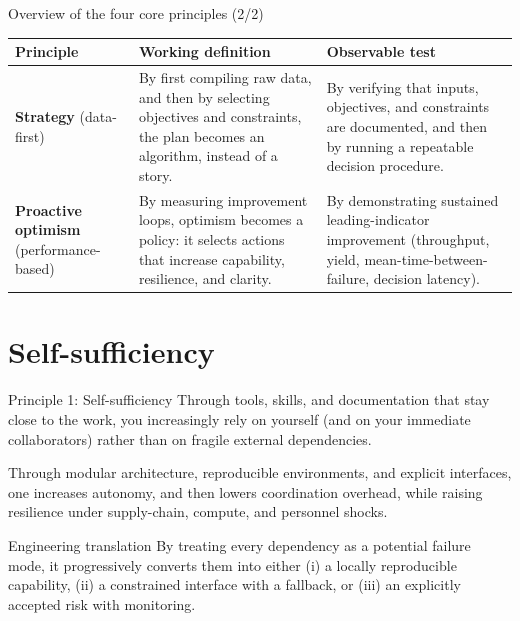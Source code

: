 \documentclass[presentation,aspectratio=169,11pt]{beamer}
\newcommand{\KeyTerm}[1]{\textbf{#1}}
\begin{document}
\begin{frame}{Overview of the four core principles (2/2)}
\justifying
\begin{table}
\scriptsize
\begin{tabularx}{\linewidth}{@{}l X X@{}}
\toprule
\textbf{Principle} & \textbf{Working definition} & \textbf{Observable test}\\
\midrule
\KeyTerm{Strategy} (data-first) & By first compiling raw data, and then by selecting objectives and constraints, the plan becomes an algorithm, instead of a story. & By verifying that inputs, objectives, and constraints are documented, and then by running a repeatable decision procedure.\\
\addlinespace
\KeyTerm{Proactive optimism} (performance-based) & By measuring improvement loops, optimism becomes a policy: it selects actions that increase capability, resilience, and clarity. & By demonstrating sustained leading-indicator improvement (throughput, yield, mean-time-between-failure, decision latency).\\
\bottomrule
\end{tabularx}
\end{table}
\end{frame}

\section{Self-sufficiency}

\begin{frame}{Principle 1: Self-sufficiency}
\justifying
Through tools, skills, and documentation that stay close to the work, you increasingly rely on yourself (and on your immediate collaborators) rather than on fragile external dependencies.

\vspace{0.6em}
Through modular architecture, reproducible environments, and explicit interfaces, one increases autonomy, and then lowers coordination overhead, while raising resilience under supply-chain, compute, and personnel shocks.

\vspace{0.8em}
\begin{block}{Engineering translation}
\justifying
By treating every dependency as a potential failure mode, it progressively converts them into either (i) a locally reproducible capability, (ii) a constrained interface with a fallback, or (iii) an explicitly accepted risk with monitoring.
\end{block}
\end{frame}
\end{document}
